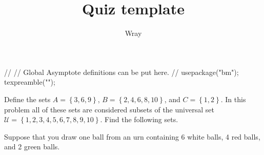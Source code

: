 \documentclass[addpoints, 12pt]{exam}
\title{Quiz template}
\author{Wray}
\begin{document}
\begin{asydef}
//
// Global Asymptote definitions can be put here.
//
usepackage("bm");
texpreamble("\def\V#1{\bm{#1}}");
\end{asydef}



\bigskip

             
\bigskip
\bigskip

\smallskip

\begin{questions}

\question[10]
Define the sets $A = \left\lbrace 3, 6 ,9 \right\rbrace$,
$B = \left\lbrace 2, 4, 6, 8, 10 \right\rbrace$, and $C = \left\lbrace 1,2 \right\rbrace$.
In this problem all of these sets are considered subsets of the universal set 
$\mathcal{U} = \left\lbrace 1, 2, 3, 4, 5, 6, 7, 8, 9, 10 \right\rbrace$.  Find the following sets.

\newpage

\question[10]
Suppose that you draw one ball from an urn containing 6 white balls, 4 red balls, and 2 green balls.


\end{questions}
\end{document}
